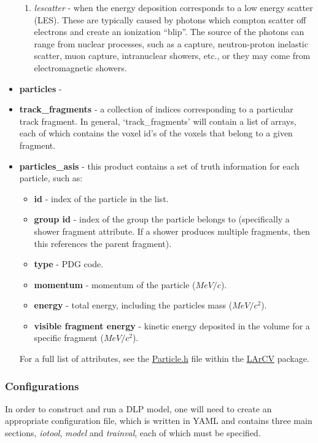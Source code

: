 \documentclass[8pt]{refart}
\newcommand*{\also}[2]{(\emph{\alsoname} #1)}
\begin{document}
\begin{itemize}
\begin{enumerate}
        \item \textit{lescatter} - when the energy deposition corresponds to a low energy scatter (LES).  These are typically caused by photons which compton scatter off electrons and create an ionization ``blip''.  The source of the photons can range from nuclear processes, such as a capture, neutron-proton inelastic scatter, muon capture, intranuclear showers, etc., or they may come from electromagnetic showers.
    \end{enumerate}
    \item \textbf{particles} - 
    \item \textbf{track\_fragments}\label{trackfragments} - a collection of indices corresponding to a particular track fragment.  In general, `track\_fragments' will contain a list of arrays, each of which contains the voxel id's of the voxels that belong to a given fragment.
    \item \textbf{particles\_asis}\label{particlesasis} - this product contains a set of truth information for each particle, such as:
    \begin{itemize}
        \item \textbf{id} - index of the particle in the list.
        \item \textbf{group id} - index of the group the particle belongs to (specifically a shower fragment attribute.  If a shower produces multiple fragments, then this references the parent fragment).
        \item \textbf{type} - PDG code.
        \item \textbf{momentum} - momentum of the particle ($MeV/c$).
        \item \textbf{energy} - total energy, including the particles mass ($MeV/c^2$).
        \item \textbf{visible fragment energy} - kinetic energy deposited in the volume for a specific fragment ($MeV/c^2$).
    \end{itemize}
    For a full list of attributes, see the \href{https://github.com/DeepLearnPhysics/larcv2/blob/develop/larcv/core/DataFormat/Particle.h}{Particle.h} file within the \href{https://github.com/DeepLearnPhysics/larcv2}{LArCV} package.
\end{itemize}

\subsubsection{Configurations}
In order to construct and run a DLP model, one will need to create an appropriate configuration file, which is written in YAML \cite{YAML} and contains three main sections, \textit{iotool}, \textit{model} and \textit{trainval}, each of which must be specified.
\end{document}
